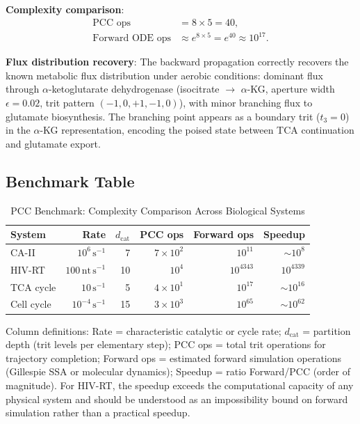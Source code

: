 \medskip
\noindent\textbf{Complexity comparison}:
\begin{align}
\label{eq:ch05-tca-complexity}
    \text{PCC ops} &= 8 \times 5 = 40, \\
    \text{Forward ODE ops} &\approx e^{8 \times 5} = e^{40} \approx 10^{17}.
\end{align}

\medskip
\noindent\textbf{Flux distribution recovery}:
The backward propagation correctly recovers the known metabolic flux
distribution under aerobic conditions: dominant flux through
$\alpha$-ketoglutarate dehydrogenase (isocitrate $\to$ $\alpha$-KG,
aperture width $\epsilon = 0.02$, trit pattern $(-1, 0, +1, -1, 0)$),
with minor branching flux to glutamate biosynthesis.  The branching point
appears as a boundary trit ($t_3 = 0$) in the $\alpha$-KG representation,
encoding the poised state between TCA continuation and glutamate export.

\subsection{Benchmark Table}

\begin{table}[ht]
\centering
\caption{PCC Benchmark: Complexity Comparison Across Biological Systems}
\label{tab:ch05-benchmark}
\begin{tabular}{lrrrrr}
\toprule
\textbf{System} & \textbf{Rate} & $d_{\mathrm{cat}}$ &
    \textbf{PCC ops} & \textbf{Forward ops} & \textbf{Speedup} \\
\midrule
CA-II      & $10^6\,\mathrm{s}^{-1}$   & 7  & $7 \times 10^2$    & $10^{11}$   & $\sim 10^8$ \\
HIV-RT     & $100\,\mathrm{nt\,s}^{-1}$ & 10 & $10^4$             & $10^{4343}$ & $10^{4339}$ \\
TCA cycle  & $10\,\mathrm{s}^{-1}$      & 5  & $4 \times 10^1$    & $10^{17}$   & $\sim 10^{16}$ \\
Cell cycle & $10^{-4}\,\mathrm{s}^{-1}$ & 15 & $3 \times 10^3$    & $10^{65}$   & $\sim 10^{62}$ \\
\bottomrule
\end{tabular}

\medskip
\small
Column definitions: Rate = characteristic catalytic or cycle rate;
$d_{\mathrm{cat}}$ = partition depth (trit levels per elementary step);
PCC ops = total trit operations for trajectory completion;
Forward ops = estimated forward simulation operations (Gillespie SSA or
  molecular dynamics);
Speedup = ratio Forward/PCC (order of magnitude).
For HIV-RT, the speedup exceeds the computational capacity of any physical
system and should be understood as an impossibility bound on forward
simulation rather than a practical speedup.
\end{table}

